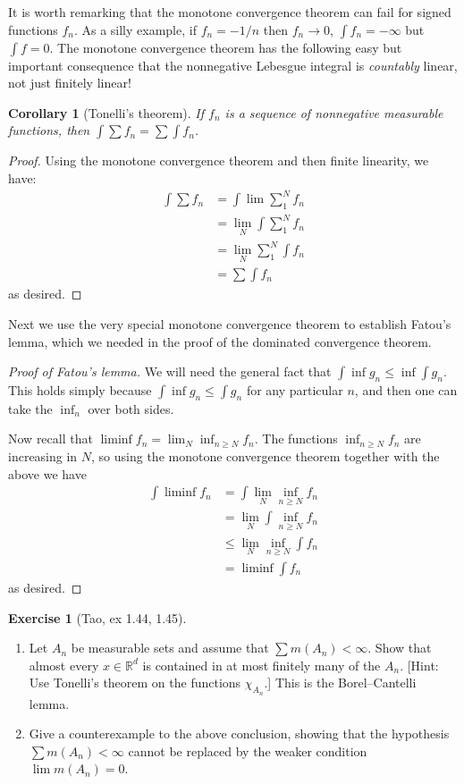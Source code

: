 \documentclass[11pt,oneside]{amsbook}
\newcommand{\RR}{{\mathbb R}}
\theoremstyle{definition}
\newtheorem{exerc}{Exercise}[section]
\theoremstyle{plain}
\newtheorem{cor}[thm]{Corollary}
\theoremstyle{definition}
\theoremstyle{remark}
\numberwithin{equation}{section}
\numberwithin{figure}{section}
\begin{document}
It is worth remarking that the monotone convergence theorem can fail for signed functions $f_n$. As a silly example, if $f_n=-1/n$ then $f_n\to0$, $\int f_n=-\infty$ but $\int f=0$. The monotone convergence theorem has the following easy but important consequence that the nonnegative Lebesgue integral is \emph{countably} linear, not just finitely linear!

\begin{cor}[Tonelli's theorem]
  If $f_n$ is a sequence of nonnegative measurable functions, then $\int\sum f_n=\sum\int f_n$.
\end{cor}

\begin{proof}
  Using the monotone convergence theorem and then finite linearity, we have:
  \begin{align*}
    \int\sum f_n&=\int\lim\sum_1^Nf_n\\
                &=\lim_N\int\sum_1^Nf_n\\
                &=\lim_N\sum_1^N\int f_n\\
                &=\sum\int f_n
  \end{align*}
  as desired.
\end{proof}

Next we use the very special monotone convergence theorem to establish Fatou's lemma, which we needed in the proof of the dominated convergence theorem.

\begin{proof}[Proof of Fatou's lemma]
  We will need the general fact that $\int\inf g_n\leq\inf\int g_n$. This holds simply because $\int\inf g_n\leq\int g_n$ for any particular $n$, and then one can take the $\inf_n$ over both sides.

  Now recall that $\liminf f_n=\lim_N\inf_{n\geq N}f_n$. The functions $\inf_{n\geq N}f_n$ are increasing in $N$, so using the monotone convergence theorem together with the above we have
  \begin{align*}
    \int\liminf f_n&=\int\lim_N\inf_{n\geq N} f_n\\
                    &=\lim_N\int\inf_{n\geq N}f_n\\
                    &\leq\lim_N\inf_{n\geq N}\int f_n\\
                    &=\liminf\int f_n
  \end{align*}
  as desired.
\end{proof}

\begin{exerc}[Tao, ex 1.44, 1.45]
  \begin{enumerate}
    \item Let $A_n$ be measurable sets and assume that $\sum m(A_n)<\infty$. Show that almost every $x\in\RR^d$ is contained in at most finitely many of the $A_n$. [Hint: Use Tonelli's theorem on the functions $\chi_{A_n}$.] This is the Borel--Cantelli lemma.
    \item Give a counterexample to the above conclusion, showing that the hypothesis $\sum m(A_n)<\infty$ cannot be replaced by the weaker condition $\lim m(A_n)=0$.
  \end{enumerate}
\end{exerc}
\end{document}
